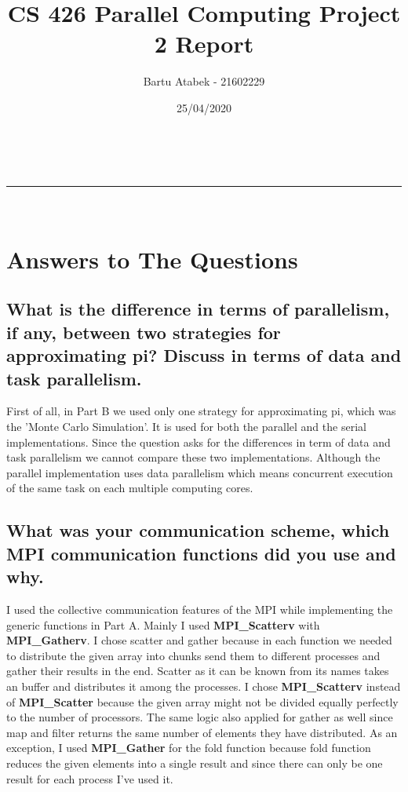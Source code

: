 \documentclass[a4paper,11pt]{article}
\makeatletter
\newcommand{\linia}{\rule{\linewidth}{0.5pt}}
\theoremstyle{mytheor}
\renewcommand{\maketitle}{
\begin{center}
\vspace{2ex}
{\huge \textsc{\@title}}
\vspace{1ex}
\\
\linia\\
\@author \hfill \@date
\vspace{4ex}
\end{center}
}
\makeatother
\begin{document}
\title{CS 426 Parallel Computing Project 2 Report}

\author{Bartu Atabek - 21602229}

\date{25/04/2020}

\maketitle

\section{Answers to The Questions}
\subsection{What is the difference in terms of parallelism, if any, between two strategies for approximating pi? Discuss in terms of data and task parallelism.}

First of all, in Part B we used only one strategy for approximating pi, which was the 'Monte Carlo Simulation'. It is used for both the parallel and the serial implementations. Since the question asks for the differences in term of data and task parallelism we cannot compare these two implementations. Although the parallel implementation uses data parallelism which means concurrent execution of the same task on each multiple computing cores. 

\subsection{What was your communication scheme, which MPI communication functions did you use and why.}

I used the collective communication features of the MPI while implementing the generic functions in Part A. Mainly I used \textbf{MPI\_Scatterv} with \textbf{MPI\_Gatherv}. I chose scatter and gather because in each function we needed to distribute the given array into chunks send them to different processes and gather their results in the end. Scatter as it can be known from its names takes an buffer and distributes it among the processes. I chose \textbf{MPI\_Scatterv} instead of \textbf{MPI\_Scatter} because the given array might not be divided equally perfectly to the number of processors. The same logic also applied for gather as well since map and filter returns the same number of elements they have distributed. As an exception, I used \textbf{MPI\_Gather} for the fold function because fold function reduces the given elements into a single result and since there can only be one result for each process I've used it.
\end{document}
